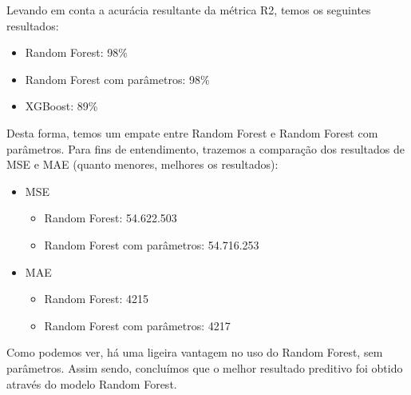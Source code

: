 Levando em conta a acurácia resultante da métrica R2, temos os seguintes resultados:
\begin{itemize}
    \item Random Forest: 98\%
    \item Random Forest com parâmetros: 98\%
    \item XGBoost: 89\%
\end{itemize}
Desta forma, temos um empate entre Random Forest e Random Forest com parâmetros. Para fins de entendimento, trazemos a comparação dos resultados de MSE e MAE (quanto menores, melhores os resultados):

\begin{itemize}
    \item MSE
    \begin{itemize}
        \item Random Forest: 54.622.503
        \item Random Forest com parâmetros: 54.716.253
    \end{itemize}
    \item MAE
    \begin{itemize}
        \item Random Forest: 4215
        \item Random Forest com parâmetros: 4217
    \end{itemize}
\end{itemize}

Como podemos ver, há uma ligeira vantagem no uso do Random Forest, sem parâmetros. Assim sendo, concluímos que o melhor resultado preditivo foi obtido através do modelo Random Forest.